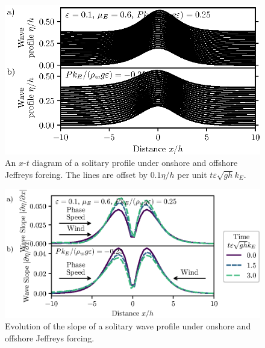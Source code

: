 \documentclass{jfm}
\renewcommand*{\epsilon}{\varepsilon}
\begin{document}
\begin{figure}
  \centering
  \includegraphics{XT-Offset.eps}
  \caption{
    An $x$-$t$ diagram of a solitary profile under onshore and offshore
    Jeffreys forcing.
    The lines are offset by $0.1 \eta/h$ per unit $t \epsilon \sqrt{g h}
    k_E$.
  }
\end{figure}

\begin{figure}
  \centering
  \includegraphics{Slopes-Positive-Negative.eps}
  \caption{
    Evolution of the slope of a solitary wave profile under onshore and
    offshore Jeffreys forcing.
  }
\end{figure}
\end{document}
